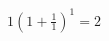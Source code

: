 \documentclass[preview]{standalone}
\begin{document}
\begin{align*}
1\left( 1 + \frac{1}{1} \right)^1 = 2
\end{align*}
\end{document}
